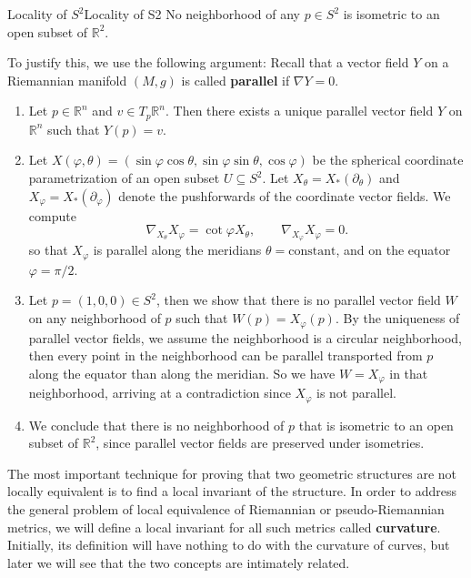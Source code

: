 \documentclass[../main.tex]{subfiles}
\begin{document}
\begin{example}{Locality of $S^2$}{Locality of S2}
	No neighborhood of any $p \in S^2$ is isometric to an open subset of $\mathbb{R}^2$.

	To justify this, we use the following argument: Recall that a vector field $Y$ on a Riemannian manifold $(M, g)$ is called \textbf{parallel} if $\nabla Y = 0$.
	\begin{enumerate}
		\item Let $p \in \mathbb{R}^n$ and $v \in T_p \mathbb{R}^n$. Then there exists a unique parallel vector field $Y$ on $\mathbb{R}^n$ such that $Y(p) = v$.
		\item Let $X(\varphi, \theta) = (\sin \varphi \cos \theta, \sin \varphi \sin \theta, \cos \varphi)$ be the spherical coordinate parametrization of an open subset $U \subseteq S^2$. Let $X_{\theta} = X_*(\partial_\theta)$ and $X_{\varphi} = X_*(\partial_\varphi)$ denote the pushforwards of the coordinate vector fields. We compute
		      \begin{equation*}
			      \nabla_{X_\theta} X_\varphi = \cot \varphi X_\theta, \qquad \nabla_{X_\varphi} X_\varphi = 0.
		      \end{equation*}
		      so that $X_{\varphi}$ is parallel along the meridians $\theta = \text{constant}$, and on the equator $\varphi = \pi/2$.
		\item Let $p = (1, 0, 0) \in S^2$, then we show that there is no parallel vector field $W$ on any neighborhood of $p$ such that $W(p) = X_\varphi(p)$. By the uniqueness of parallel vector fields, we assume the neighborhood is a circular neighborhood, then every point in the neighborhood can be parallel transported from $p$ along the equator than along the meridian. So we have $W = X_\varphi$ in that neighborhood, arriving at a contradiction since $X_{\varphi}$ is not parallel.
		\item We conclude that there is no neighborhood of $p$ that is isometric to an open subset of $\mathbb{R}^2$, since parallel vector fields are preserved under isometries.
	\end{enumerate}
\end{example}

The most important technique for proving that two geometric structures are not locally equivalent is to find a local invariant of the structure. In order to address the general problem of local equivalence of Riemannian or pseudo-Riemannian metrics, we will define a local invariant for all such metrics called \textbf{curvature}. Initially, its definition will have nothing to do with the curvature of curves, but later we will see that the two concepts are intimately related.
\end{document}
